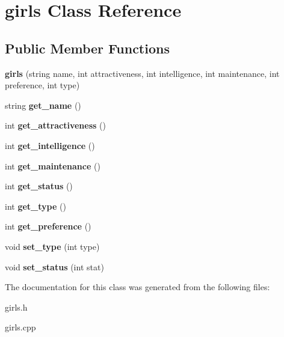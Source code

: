 \hypertarget{classgirls}{}\section{girls Class Reference}
\label{classgirls}
\subsection*{Public Member Functions}
\begin{DoxyCompactItemize}
\item 
{\bfseries girls} (string name, int attractiveness, int intelligence, int maintenance, int preference, int type)\hypertarget{classgirls_ab42da28301a33d2de2e8b4dba0c60d7d}{}\label{classgirls_ab42da28301a33d2de2e8b4dba0c60d7d}

\item 
string {\bfseries get\+\_\+name} ()\hypertarget{classgirls_a220e8fea4d5d15960c5846e74dc7eca7}{}\label{classgirls_a220e8fea4d5d15960c5846e74dc7eca7}

\item 
int {\bfseries get\+\_\+attractiveness} ()\hypertarget{classgirls_a5bd99bdda6592a1d333ed8d7ff83e42f}{}\label{classgirls_a5bd99bdda6592a1d333ed8d7ff83e42f}

\item 
int {\bfseries get\+\_\+intelligence} ()\hypertarget{classgirls_a9b17761ac2aed859cccb37cedf40be99}{}\label{classgirls_a9b17761ac2aed859cccb37cedf40be99}

\item 
int {\bfseries get\+\_\+maintenance} ()\hypertarget{classgirls_a10ea1fedfb75371d073fd6ccea0eab10}{}\label{classgirls_a10ea1fedfb75371d073fd6ccea0eab10}

\item 
int {\bfseries get\+\_\+status} ()\hypertarget{classgirls_ac81afe3e1e2e43c2cbff6db874153f56}{}\label{classgirls_ac81afe3e1e2e43c2cbff6db874153f56}

\item 
int {\bfseries get\+\_\+type} ()\hypertarget{classgirls_a10a167d3634309ee9dd6e80738388e52}{}\label{classgirls_a10a167d3634309ee9dd6e80738388e52}

\item 
int {\bfseries get\+\_\+preference} ()\hypertarget{classgirls_abb3d691bbad977b6b5bba7b779143e4e}{}\label{classgirls_abb3d691bbad977b6b5bba7b779143e4e}

\item 
void {\bfseries set\+\_\+type} (int type)\hypertarget{classgirls_a96367a0bf799cf5d80db86335a8bf51c}{}\label{classgirls_a96367a0bf799cf5d80db86335a8bf51c}

\item 
void {\bfseries set\+\_\+status} (int stat)\hypertarget{classgirls_ad58259417fa247f5b2723bebe5069cee}{}\label{classgirls_ad58259417fa247f5b2723bebe5069cee}

\end{DoxyCompactItemize}


The documentation for this class was generated from the following files\+:\begin{DoxyCompactItemize}
\item 
girls.\+h\item 
girls.\+cpp\end{DoxyCompactItemize}
